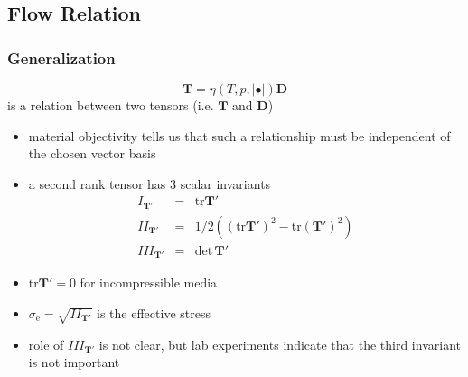\documentclass[hide notes,intlimits]{beamer}
\begin{document}
\subsection{Flow Relation}


\begin{frame}
  \frametitle{Generalization}
  \begin{equation}
    \mathbf{T} = \eta\left(T,p,\vert \bullet \vert\right)\mathbf{D}
  \end{equation}
  is a relation between two tensors (i.e. $\mathbf{T}$ and $\mathbf{D}$)
  \begin{itemize}
  \item \alert{material objectivity} tells us that such a relationship must be independent of the chosen vector basis
  \item a second rank tensor has 3 scalar invariants
    \begin{eqnarray}
      I_{\mathbf{T}'} & = & \text{tr}\mathbf{T}' \\
      II_{\mathbf{T}'} & = & 1/2\left(\left(\text{tr}\mathbf{T}'\right)^{2}  -\text{tr}\left(\mathbf{T}'\right)^{2}\right)\\
      III_{\mathbf{T}'} & = & \text{det}\,\mathbf{T}'
    \end{eqnarray}
    \item $\text{tr}\mathbf{T}'=0$ for incompressible media
    \item $\sigma_{\text{e}} = \sqrt{II_{\mathbf{T}'}}$ is the \alert{effective stress}
    \item role of $ III_{\mathbf{T}'}$ is not clear, but lab experiments indicate that the third invariant is not important
  \end{itemize}
\end{frame}
\end{document}
